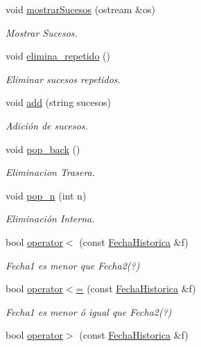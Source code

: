 \begin{DoxyCompactItemize}
void \hyperlink{classFechaHistorica_a5c1a1d6cf44b8a1414d6d682479e377a}{mostrar\+Sucesos} (ostream \&os)
\begin{DoxyCompactList}\small\item\em Mostrar Sucesos. \end{DoxyCompactList}\item 
void \hyperlink{classFechaHistorica_ad177f5f096cac630b01e86645cc20629}{elimina\+\_\+repetido} ()
\begin{DoxyCompactList}\small\item\em Eliminar sucesos repetidos. \end{DoxyCompactList}\item 
void \hyperlink{classFechaHistorica_ad69f7b15d79d9329f03fc948b620b78f}{add} (string sucesos)
\begin{DoxyCompactList}\small\item\em Adición de sucesos. \end{DoxyCompactList}\item 
void \hyperlink{classFechaHistorica_adb9bbf902dc5fe70e96aadeff57ce530}{pop\+\_\+back} ()
\begin{DoxyCompactList}\small\item\em Eliminacion Trasera. \end{DoxyCompactList}\item 
void \hyperlink{classFechaHistorica_a98e9e2191117ed696f09c8d61f1742b2}{pop\+\_\+n} (int n)
\begin{DoxyCompactList}\small\item\em Eliminación Interna. \end{DoxyCompactList}\item 
bool \hyperlink{classFechaHistorica_ab37db2253eb8061611ad132243b10242}{operator$<$} (const \hyperlink{classFechaHistorica}{Fecha\+Historica} \&f)
\begin{DoxyCompactList}\small\item\em Fecha1 es menor que Fecha2(?) \end{DoxyCompactList}\item 
bool \hyperlink{classFechaHistorica_aa1a467a5bc0e76ae1fd2a81b9c9c4d61}{operator$<$=} (const \hyperlink{classFechaHistorica}{Fecha\+Historica} \&f)
\begin{DoxyCompactList}\small\item\em Fecha1 es menor ó igual que Fecha2(?) \end{DoxyCompactList}\item 
bool \hyperlink{classFechaHistorica_a64f8f42d6c4609f323d47b58dbac811f}{operator$>$} (const \hyperlink{classFechaHistorica}{Fecha\+Historica} \&f)

\end{DoxyCompactItemize}
